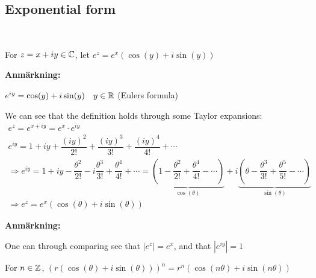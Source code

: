 \subsection{Exponential form}\hfill\\\par
\begin{theo}[]{}
  For $z = x+iy\in\mathbb{C}$, let $e^z = e^x(\cos(y)+i\sin(y))$
\end{theo}
\par\bigskip
\noindent\textbf{Anmärkning:}\par
\noindent $e^{iy} = \cos(y)+i\sin(y)\quad y\in\mathbb{R}$ (Eulers formula)
\par\bigskip
\noindent We can see that the definition holds through some Taylor expansions:
\begin{equation*}
  \begin{gathered}
    e^z = e^{x+iy} = e^x\cdot e^{iy}\\
    e^{iy} = 1+iy+\dfrac{(iy)^2}{2!}+\dfrac{(iy)^3}{3!}+\dfrac{(iy)^4}{4!}+\cdots\\
    \Rightarrow e^{iy} = 1+iy-\dfrac{\theta^2}{2!}-i\dfrac{\theta^3}{3!}+\dfrac{\theta^4}{4!}+\cdots = \underbrace{\left(1-\dfrac{\theta^2}{2!}+\dfrac{\theta^4}{4!}-\cdots\right)}_{\text{$\cos(\theta)$}}+i\underbrace{\left(\theta-\dfrac{\theta^3}{3!}+\dfrac{\theta^5}{5!}-\cdots\right)}_{\text{$\sin(\theta)$}}\\
    \Rightarrow e^z = e^x(\cos(\theta)+i\sin(\theta))
  \end{gathered}
\end{equation*}
\par\bigskip
\noindent\textbf{Anmärkning:}\par
\noindent One can through comparing see that $\left|e^z\right| = e^x$, and that $\left|e^{iy}\right|= 1$
\par\bigskip
\begin{theo}{}
  For $n\in\mathbb{Z}$, $(r(\cos(\theta)+i\sin(\theta)))^n = r^n(\cos(n\theta)+i\sin(n\theta))$ 
\end{theo}
\par\bigskip
